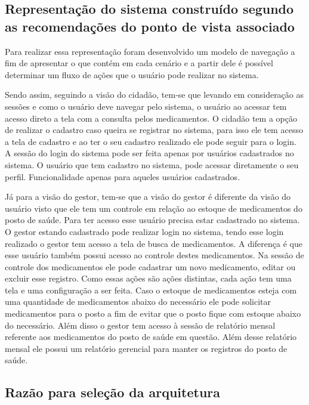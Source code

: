 \subsection{Representação do sistema construído segundo as recomendações do ponto de vista associado}

Para realizar essa representação foram desenvolvido um modelo de navegação a fim de apresentar o que contém em cada cenário e a partir dele é possível determinar um fluxo de ações que o usuário pode realizar no sistema. 

Sendo assim, seguindo a visão do cidadão, tem-se que levando em consideração as sessões e como o usuário deve navegar pelo sistema, o usuário ao acessar tem acesso direto a tela com a consulta pelos medicamentos.
O cidadão tem a opção de realizar o cadastro caso queira se registrar no sistema, para isso ele tem acesso a tela de cadastro e ao ter o seu cadastro realizado ele pode seguir para o login.
A sessão do login do sistema pode ser feita apenas por usuários cadastrados no sistema. 
O usuário que tem cadastro no sistema, pode acessar diretamente o seu perfil. Funcionalidade apenas para aqueles usuários cadastrados.

Já para a visão do gestor, tem-se que a visão do gestor é diferente da visão do usuário visto que ele tem um controle em relação ao estoque de medicamentos do posto de saúde. Para ter acesso esse usuário precisa estar cadastrado no sistema. O gestor estando cadastrado pode realizar login no sistema, tendo esse login realizado o gestor tem acesso a tela de busca de medicamentos. A diferença é que esse usuário também possui acesso ao controle destes medicamentos.
Na sessão de controle dos medicamentos ele pode cadastrar um novo medicamento, editar ou excluir esse registro. Como essas ações são ações distintas, cada ação tem uma tela e uma configuração a ser feita.
Caso o estoque de medicamentos esteja com uma quantidade de medicamentos abaixo do necessário ele pode solicitar medicamentos para o posto a fim de evitar que o posto fique com estoque abaixo do necessário.
Além disso o gestor tem acesso à sessão de relatório mensal referente aos medicamentos do posto de saúde em questão.
Além desse relatório mensal ele possui um relatório gerencial para manter os registros do posto de saúde.

\subsection{Razão para seleção da arquitetura}

